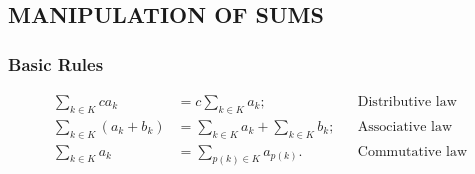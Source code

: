 \documentclass{article}
\newcommand{\insertcode}[2]{\begin{itemize}\item[]\end{itemize}}
\begin{document}
\subsection{MANIPULATION OF SUMS}
\subsubsection{Basic Rules}

\begin{align}
\sum_{k\in K} ca_k &= c\sum_{k\in K}a_k; && \text{Distributive law}\\
\sum_{k\in K} {(a_k+b_k)} &= \sum_{k\in K}a_k + \sum_{k\in K}b_k; && \text{Associative law}\\
\sum_{k\in K} a_k &= \sum_{p(k)\in K}a_{p(k)}. && \text{Commutative law}
\end{align}

%

\end{document}
